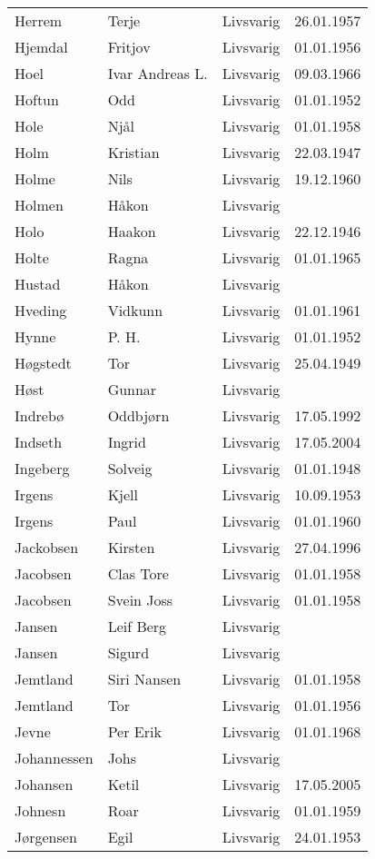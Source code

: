 \begin{longtable}{llll}
Herrem	&	Terje	&	Livsvarig 	&	26.01.1957	\\
Hjemdal	&	Fritjov	&	Livsvarig 	&	01.01.1956	\\
Hoel	&	Ivar Andreas L.	&	Livsvarig 	&	09.03.1966	\\
Hoftun	&	Odd	&	Livsvarig 	&	01.01.1952	\\
Hole	&	Njål	&	Livsvarig 	&	01.01.1958	\\
Holm	&	Kristian	&	Livsvarig 	&	22.03.1947	\\
Holme	&	Nils	&	Livsvarig 	&	19.12.1960	\\
Holmen	&	Håkon	&	Livsvarig 	&		\\
Holo	&	Haakon	&	Livsvarig 	&	22.12.1946	\\
Holte	&	Ragna	&	Livsvarig 	&	01.01.1965	\\
Hustad	&	Håkon	&	Livsvarig 	&		\\
Hveding	&	Vidkunn	&	Livsvarig 	&	01.01.1961	\\
Hynne	&	P. H. 	&	Livsvarig 	&	01.01.1952	\\
Høgstedt	&	Tor	&	Livsvarig 	&	25.04.1949	\\
Høst	&	Gunnar	&	Livsvarig 	&		\\
Indrebø	&	Oddbjørn	&	Livsvarig 	&	17.05.1992	\\
Indseth 	&	Ingrid	&	Livsvarig	&	17.05.2004	\\
Ingeberg	&	Solveig	&	Livsvarig 	&	01.01.1948	\\
Irgens	&	Kjell	&	Livsvarig 	&	10.09.1953	\\
Irgens	&	Paul	&	Livsvarig 	&	01.01.1960	\\
Jackobsen 	&	Kirsten	&	Livsvarig	&	27.04.1996	\\
Jacobsen	&	Clas Tore	&	Livsvarig 	&	01.01.1958	\\
Jacobsen	&	Svein Joss	&	Livsvarig 	&	01.01.1958	\\
Jansen	&	Leif Berg	&	Livsvarig 	&		\\
Jansen	&	Sigurd	&	Livsvarig 	&		\\
Jemtland	&	Siri Nansen	&	Livsvarig 	&	01.01.1958	\\
Jemtland	&	Tor	&	Livsvarig 	&	01.01.1956	\\
Jevne	&	Per Erik	&	Livsvarig 	&	01.01.1968	\\
Johannessen	&	Johs	&	Livsvarig 	&		\\
Johansen 	&	Ketil	&	Livsvarig	&	17.05.2005	\\
Johnesn	&	Roar	&	Livsvarig 	&	01.01.1959	\\
Jørgensen	&	Egil	&	Livsvarig 	&	24.01.1953	\\

\end{longtable}
